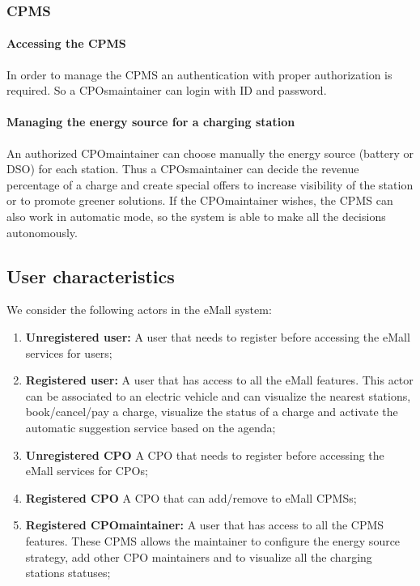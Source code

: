 \subsubsection{\acf{CPMS}}
\paragraph{Accessing the \ac{CPMS}}
In order to manage the \ac{CPMS} an authentication with proper authorization is required. So a \acp{CPO}maintainer can login with ID and password.

\paragraph{Managing the energy source for a charging station}
An authorized \ac{CPO}maintainer can choose manually the energy source (battery or \ac{DSO}) for each station.
Thus a \acp{CPO}maintainer can decide the revenue percentage of a charge and create special offers to increase visibility of the station or to promote greener solutions. If the \ac{CPO}maintainer wishes, the \ac{CPMS} can also work in automatic mode, so the system is able to make all the decisions autonomously.


\subsection{User characteristics}
We consider the following actors in the \ac{eMall} system:
\begin{enumerate}[label=\textbf{A\arabic*}]
      \item \textbf{Unregistered user:} A user that needs to register before accessing the \ac{eMall} services for users;
      \item \textbf{Registered user:} A user that has access to all the \ac{eMall} features.
            This actor can be associated to an electric vehicle and can visualize the nearest stations, book/cancel/pay a charge, visualize the status of a charge and activate the automatic suggestion service based on the agenda;
      \item \textbf{Unregistered \ac{CPO}} A \ac{CPO} that needs to register before accessing the \ac{eMall} services for \acp{CPO};
      \item \textbf{Registered \ac{CPO}} A \ac{CPO} that can add/remove to \ac{eMall} \acp{CPMS};
      \item \textbf{Registered \ac{CPO}maintainer:} A user that has access to all the \ac{CPMS} features. These \ac{CPMS} allows the maintainer to configure the energy source strategy, add other \ac{CPO} maintainers and to visualize all the charging stations statuses;
\end{enumerate}

